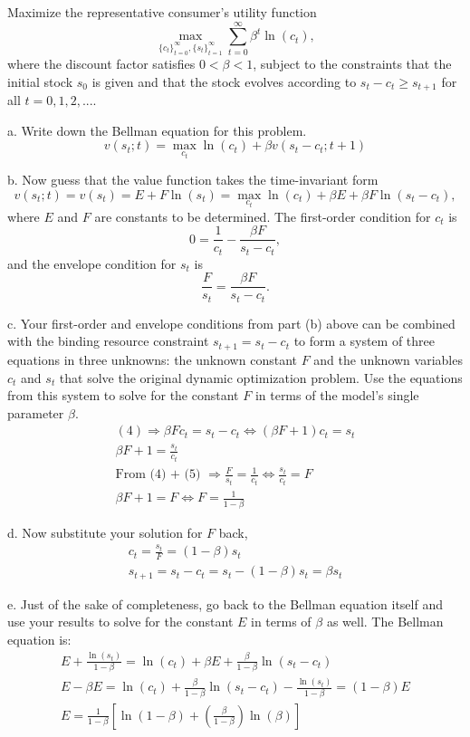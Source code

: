 \documentclass[12pt]{article}
\begin{document}
Maximize the representative consumer's utility function
$$
\max_{\{c_t\}^{\infty}_{t=0}, \{s_t\}^{\infty}_{t=1}} \sum_{t=0}^{\infty} \beta^{t} \ln(c_{t}),
$$
where the discount factor satisfies $0<\beta<1$, subject to the constraints that the initial stock $s_{0}$ is given and that the stock evolves according to $s_{t}-c_{t} \geq s_{t+1}$ for all $t=0,1,2,...$.
\begin{description}
\item a. Write down the Bellman equation for this problem.
$$
v(s_t;t) = \max_{c_t}\ln(c_t) + \beta v(s_t - c_t;t+1)
$$
\item b. Now guess that the value function takes the time-invariant form
$$
v(s_{t};t) = v(s_{t}) = E + F \ln(s_{t}) = \max_{c_t}\ln(c_t) + \beta E + \beta F\ln(s_t - c_t),
$$
where $E$ and $F$ are constants to be determined. The first-order condition for $c_{t}$ is
\begin{equation}
0 = \frac{1}{c_t} - \frac{\beta F}{s_t-c_t}, 
\end{equation}
and the envelope condition for $s_{t}$ is 
\begin{equation}
\frac{F}{s_t} = \frac{\beta F}{s_t-c_t}. 
\end{equation}
\item c. Your first-order and envelope conditions from part (b) above can be combined with the binding resource constraint
$s_{t+1} = s_{t} - c_{t}$ to form a system of three equations in three unknowns: the unknown constant $F$ and the unknown variables $c_{t}$ and $s_{t}$ that solve the original dynamic optimization problem. Use the equations from this system to solve for the constant $F$ in terms of the model's single parameter $\beta$.
\begin{gather*}
(4) \Rightarrow \beta Fc_t = s_t-c_t \iff (\beta F + 1)c_t = s_t \\ 
\beta F + 1 = \frac{s_t}{c_t} \\ 
\text{From (4) + (5) } \Rightarrow \frac{F}{s_t} = \frac{1}{c_t} \iff \frac{s_t}{c_t} = F \\ 
\beta F + 1 = F \iff F = \frac{1}{1-\beta}
\end{gather*}
\item d. Now substitute your solution for $F$ back, 
\begin{gather*}
c_t = \frac{s_t}{F} = (1-\beta)s_t \\ 
s_{t+1} = s_t - c_t = s_t - (1-\beta)s_t = \beta s_t
\end{gather*}
\item e. Just of the sake of completeness, go back to the Bellman equation itself and use your results to solve for the constant $E$ in terms of $\beta$ as well. The Bellman equation is: 
\begin{gather*} 
E + \frac{\ln(s_t)}{1-\beta} = \ln(c_t) + \beta E + \frac{\beta}{1-\beta} \ln(s_t - c_t)   \\ 
E - \beta E = \ln(c_t) + \frac{\beta}{1-\beta} \ln(s_t - c_t) - \frac{\ln(s_t)}{1-\beta} = (1-\beta)E    \\ 
E = \frac{1}{1-\beta}[\ln(1-\beta) + (\frac{\beta}{1-\beta})\ln(\beta)]
\end{gather*}

\end{description}
\end{document}
